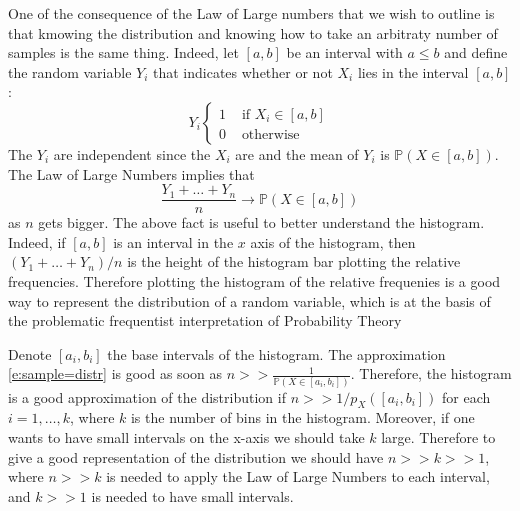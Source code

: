 	One of the consequence of the Law of Large numbers that we wish to outline is that kmowing the distribution and knowing how to take an arbitraty number of samples is the same thing. Indeed, let $[a,b]$ be an interval with $a \leq b$ and define the random variable $Y_i$ that indicates whether or not $X_i$ lies in the interval $[a,b]$: 
		\begin{equation}
			\label{e:indicator}
			Y_i
			\begin{cases}
				1 & \text{ if } X_i \in [a,b]\\
				0 & \text{ otherwise }
			\end{cases}
		\end{equation}
		The $Y_i$ are independent since the $X_i$ are and the mean of $Y_i$ is $\mathbb P( X \in [a,b])$. The Law of Large Numbers implies that 
		\begin{equation}
			\label{e:sample=distr}
			\frac{Y_1 + \ldots + Y_n}{n} \to \mathbb P(X \in [a,b])
		\end{equation}
		as $n$ gets bigger. 
		The above fact is useful to better understand the histogram. Indeed, if $[a,b]$ is an interval in the $x$ axis of the histogram, then $(Y_1 + \ldots + Y_n)/n$ is the height of the histogram bar plotting the relative frequencies. Therefore plotting the histogram of the relative frequenies is a good way to represent the distribution of a random variable, which is at the basis of the problematic frequentist interpretation of Probability Theory

	Denote $[a_i,b_i]$ the base intervals of the histogram. The approximation \eqref{e:sample=distr} is good as soon as $n >> \frac{1}{\mathbb P(X \in [a_i,b_i])}$. Therefore, the histogram is a good approximation of the distribution if $n >>1/p_X([a_i,b_i])$ for each $i =1,\ldots, k $, where $k$ is the number of bins in the histogram. Moreover, if one wants to have small intervals on the x-axis we should take $k$ large. Therefore to give a good representation of the distribution we should have $n >> k>> 1$, where $n>>k$ is needed to apply the Law of Large Numbers to each interval, and $k >>1$ is needed to have small intervals. 
		
